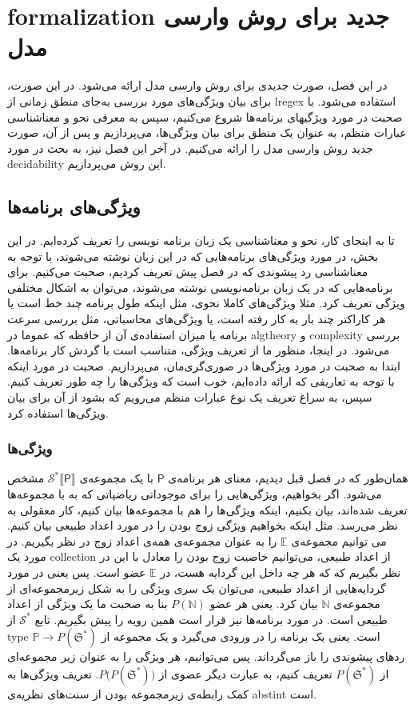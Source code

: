 
\chapter{\gls*{formalization} جدید برای روش وارسی مدل}

در این فصل، صورت جدیدی برای روش وارسی مدل ارائه ‌می‌شود. در این صورت، برای بیان ویژگی‌های مورد بررسی به‌جای منطق زمانی از \gls*{lregex} استفاده می‌شود. با صحبت در مورد ویژگیهای برنامه‌ها شروع می‌کنیم، سپس به معرفی نحو و معناشناسی عبارات منظم، به عنوان یک منطق برای بیان ویژگی‌ها، می‌پردازیم و پس از آن، صورت جدید روش وارسی مدل را ارائه می‌کنیم. در آخر این فصل نیز، به بحث در مورد \gls*{decidability} این روش می‌پردازیم. 


\section{ویژگی‌های برنامه‌ها}
تا به اینجای کار، نحو و معناشناسی یک زبان برنامه نویسی را تعریف کرده‌ایم. در این بخش، در مورد ویژگی‌های برنامه‌هایی که در این زبان نوشته می‌شوند، با توجه به معناشناسی رد پیشوندی که در فصل پیش تعریف کردیم، صحبت می‌کنیم. برای برنامه‌هایی که در یک زبان برنامه‌نویسی نوشته می‌شوند، می‌توان به اشکال مختلفی ویژگی تعریف کرد. مثلا ویژگی‌های کاملا نحوی، مثل اینکه طول برنامه چند خط است یا هر کاراکتر چند بار به کار رفته است، یا ویژگی‌های محاسباتی، مثل بررسی‌ سرعت برنامه یا میزان استفاده‌ی آن از حافظه که عموما در \gls*{algtheory} و \gls*{complexity} بررسی می‌شود. در اینجا، منظور ما از تعریف ویژگی، متناسب است با گردش کار برنامه‌ها. 
ابتدا به صحبت در مورد ویژگی‌ها در صوری‌گری‌مان، می‌پردازیم. صحبت در مورد اینکه با توجه به تعاریفی که ارائه داده‌ایم، خوب است که ویژگی‌ها را چه طور تعریف کنیم. سپس، به سراغ تعریف یک نوع عبارات منظم می‌رویم که بشود از آن برای بیان ویژگی‌ها استفاده کرد.
\subsection{ویژگی‌ها}
همان‌طور که در فصل قبل دیدیم، معنای هر برنامه‌ی $\mathsf{P}$ با یک مجموعه‌ی 
$\mathcal{S^*}\llbracket {\mathsf{P}}\rrbracket$
مشخص می‌شود. اگر بخواهیم، ویژگی‌هایی را برای موجوداتی ریاضیاتی که به با مجموعه‌ها تعریف شده‌اند، بیان بکنیم، اینکه ویژگی‌ها را هم با مجموعه‌ها بیان کنیم، کار معقولی به نظر می‌رسد. مثل اینکه بخواهیم ویژگی زوج بودن را در مورد اعداد طبیعی بیان کنیم. می توانیم مجموعه‌ی $\mathbb{E}$ را به عنوان مجموعه‌ی همه‌ی اعداد زوج در نظر بگیریم. در مورد یک \gls*{collection} از اعداد طبیعی، می‌توانیم خاصیت زوج بودن را معادل با این در نظر بگیریم که که هر چه داخل این گردایه هست، در $\mathbb{E}$ عضو است. پس یعنی در مورد گردایه‌هایی از اعداد طبیعی، می‌توان یک سری ویژگی را به شکل زیرمجموعه‌ای از مجموعه‌ی $\mathbb{N}$ بیان کرد. یعنی هر عضو 
$\mathit{P}(\mathbb{N})$
بنا به صحبت ما یک ویژگی از اعداد طبیعی است.
در مورد برنامه‌ها نیز قرار است همین رویه را پیش بگیریم. تابع 
$\mathcal{S^*}$
از \gls*{type} 
$\mathbb{P} \rightarrow \mathit{P}(\mathfrak{S^*})$
است. یعنی یک برنامه را در ورودی می‌گیرد و یک مجموعه از ردهای پیشوندی را باز می‌گرداند. پس می‌توانیم، هر ویژگی را به عنوان زیر مجموعه‌ای از 
$\mathit{P}(\mathfrak{S^*})$
تعریف کنیم، به عبارت دیگر عضوی از
$\mathit{P(P}(\mathfrak{S^*}))$. 
تعریف ویژگی‌ها به کمک رابطه‌ی زیرمجموعه بودن از سنت‌های نظریه‌ی \gls*{abstint}\cite{cousot1} است.

